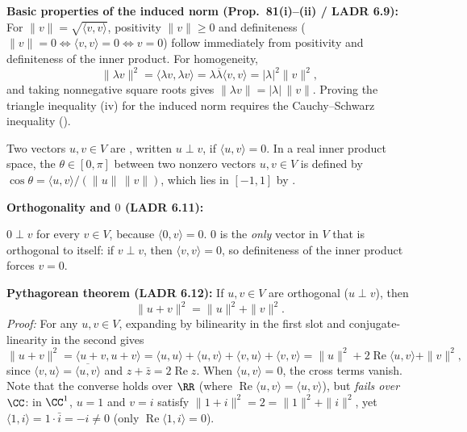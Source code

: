 \documentclass[10pt]{scrartcl}
\newcommand{\ip}[2]{\langle #1,#2\rangle}
\begin{document}
\begin{itemize}
  \ii \textbf{Basic properties of the induced norm (Prop.~81(i)--(ii) / LADR 6.9):} For $\|v\|=\sqrt{\ip vv}$, positivity $\|v\|\ge 0$ and definiteness ($\|v\|=0 \iff \ip vv=0 \iff v=0$) follow immediately from positivity and definiteness of the inner product. For homogeneity,
  \[
    \|\lambda v\|^2 = \ip{\lambda v}{\lambda v} = \lambda\overline{\lambda}\ip vv = |\lambda|^2\|v\|^2,
  \]
  and taking nonnegative square roots gives $\|\lambda v\|=|\lambda|\,\|v\|$. Proving the triangle inequality (iv) for the induced norm requires the Cauchy--Schwarz inequality ().
\end{itemize}

\begin{definition*}
  Two vectors $u,v\in V$ are , written $u\perp v$, if $\ip uv=0$. In a real inner product space, the  $\theta\in[0,\pi]$ between two nonzero vectors $u,v\in V$ is defined by $\cos\theta=\ip uv/(\|u\|\,\|v\|)$, which lies in $[-1,1]$ by .
\end{definition*}

\begin{itemize}
  \ii \textbf{Orthogonality and $0$ (LADR 6.11):}
  \begin{enumerate}[(a)]
    \ii $0\perp v$ for every $v\in V$, because $\ip 0v=0$.
    \ii $0$ is the \emph{only} vector in $V$ that is orthogonal to itself: if $v\perp v$, then $\ip vv=0$, so definiteness of the inner product forces $v=0$.
  \end{enumerate}
  \ii \textbf{Pythagorean theorem (LADR 6.12):} If $u,v\in V$ are orthogonal ($u\perp v$), then
  \[
    \|u+v\|^2 = \|u\|^2 + \|v\|^2.
  \]
  \emph{Proof:} For any $u,v\in V$, expanding by bilinearity in the first slot and conjugate-linearity in the second gives
  \[
    \|u+v\|^2 = \ip{u+v}{u+v} = \ip uu + \ip uv + \ip vu + \ip vv = \|u\|^2 + 2\operatorname{Re}\ip uv + \|v\|^2,
  \]
  since $\ip vu=\overline{\ip uv}$ and $z+\bar z=2\operatorname{Re}z$. When $\ip uv=0$, the cross terms vanish. Note that the converse holds over $\RR$ (where $\operatorname{Re}\ip uv=\ip uv$), but \emph{fails over $\CC$}: in $\CC^1$, $u=1$ and $v=i$ satisfy $\|1+i\|^2=2=\|1\|^2+\|i\|^2$, yet $\ip 1i=1\cdot\bar i=-i\ne 0$ (only $\operatorname{Re}\ip 1i=0$).
\end{itemize}
\end{document}
